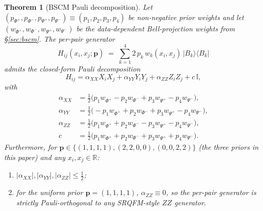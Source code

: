 \documentclass[pdflatex,sn-mathphys]{sn-jnl}
\theoremstyle{plain}
\newtheorem{theorem}{Theorem}
\theoremstyle{remark}
\theoremstyle{definition}
\begin{document}
\begin{theorem}[BSCM Pauli decomposition]\label{thm:bscm-pauli}
Let $(p_{\Phi^+}, p_{\Phi^-}, p_{\Psi^+}, p_{\Psi^-}) \equiv (p_1, p_2, p_3, p_4)$ be non-negative prior weights and let $(w_{\Phi^+}, w_{\Phi^-}, w_{\Psi^+}, w_{\Psi^-})$ be the data-dependent Bell-projection weights from \S\ref{sec:bscm}. The per-pair generator
\[
H_{ij}(x_i, x_j; \boldsymbol{p})
\;=\; \sum_{k=1}^{4} 2\, p_k\, w_k(x_i, x_j)\, |B_k\rangle\!\langle B_k|
\]
admits the closed-form Pauli decomposition
\[
H_{ij} = \alpha_{XX} X_iX_j + \alpha_{YY} Y_iY_j + \alpha_{ZZ} Z_iZ_j + c\,\mathbb{I},
\]
with
\begin{align*}
\alpha_{XX} &= \tfrac12\bigl(p_1 w_{\Phi^+} - p_2 w_{\Phi^-} + p_3 w_{\Psi^+} - p_4 w_{\Psi^-}\bigr),\\
\alpha_{YY} &= \tfrac12\bigl(-p_1 w_{\Phi^+} + p_2 w_{\Phi^-} + p_3 w_{\Psi^+} - p_4 w_{\Psi^-}\bigr),\\
\alpha_{ZZ} &= \tfrac12\bigl(p_1 w_{\Phi^+} + p_2 w_{\Phi^-} - p_3 w_{\Psi^+} - p_4 w_{\Psi^-}\bigr),\\
c &= \tfrac12\bigl(p_1 w_{\Phi^+} + p_2 w_{\Phi^-} + p_3 w_{\Psi^+} + p_4 w_{\Psi^-}\bigr).
\end{align*}
Furthermore, for $\boldsymbol{p}\in\{(1,1,1,1),(2,2,0,0),(0,0,2,2)\}$ (the three priors in this paper) and any $x_i, x_j\in\mathbb{R}$:
\begin{enumerate}
\item[(a)] $|\alpha_{XX}|, |\alpha_{YY}|, |\alpha_{ZZ}|\le \tfrac12$;
\item[(b)] for the uniform prior $\boldsymbol{p}=(1,1,1,1)$, $\alpha_{ZZ}\equiv 0$, so the per-pair generator is strictly Pauli-orthogonal to any SRQFM-style $ZZ$ generator.
\end{enumerate}
\end{theorem}
\end{document}
